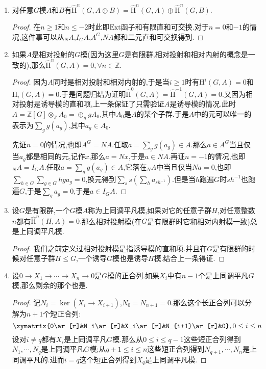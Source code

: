 \begin{enumerate}
\begin{proof}
		它们就可以拼凑成整个长正合列.
	\end{proof}
	\item 对任意$G$模$A$和$B$有$\widehat{\mathrm{H}}^n(G,A\oplus B)=\widehat{\mathrm{H}}^n(G,A)\oplus\widehat{\mathrm{H}}^n(G,B)$.
	\begin{proof}
		
		在$n\ge1$和$n\le-2$时此即$\mathrm{Ext}$函子和有限直和可交换.对于$n=0$和$-1$的情况,这件事可以从$_NA$,$I_GA$,$A^G$,$NA$都和二元直和可交换得到.
	\end{proof}
	\item 如果$A$是相对投射的$G$模(因为这里$G$是有限群,相对投射和相对内射的概念是一致的),那么$\widehat{\mathrm{H}}^n(G,A)=0,\forall n\in\mathbb{Z}$.
	\begin{proof}
		
		因为$A$同时是相对投射和相对内射的,于是当$i\ge1$时有$\mathrm{H}^i(G,A)=0$和$\mathrm{H}_i(G,A)=0$.于是问题归结为证明$\widehat{\mathrm{H}}^0(G,A)=\widehat{\mathrm{H}}^{-1}(G,A)=0$.又因为相对投射是诱导模的直和项,上一条保证了只需验证$A$是诱导模的情况.此时$A=\mathbb{Z}[G]\otimes_{\mathbb{Z}}A_0=\oplus_ggA_0$,其中$A_0$是$A$的某个子群.于是$A$中的元可以唯一的表示为$\sum_gg(a_g)$,其中$a_g\in A_0$.
		
		\qquad
		
		先证$n=0$的情况,也即$A^G=NA$.任取$a=\sum_gg(a_g)\in A$.那么$a\in A^G$当且仅当$a_g$都是相同的元,记作$x$,那么$a=Nx$,于是$a\in NA$.再证$n=-1$的情况,也即$_NA=I_GA$.任取$a=\sum_gg(a_g)\in A$,它落在$_NA$中当且仅当$Na=0$,也即$\sum_{h\in G}\sum_{g\in G}hga_g=0$,换元得到$\sum_ss(\sum_ha_{sh^{-1}})$.但是当$h$跑遍$G$时$sh^{-1}$也跑遍$G$,于是$\sum_ga_g=0$,于是$a\in I_GA$.
	\end{proof}
	\item 设$G$是有限群,一个$G$模$A$称为上同调平凡模,如果对它的任意子群$H$,对任意整数$n$都有$\widehat{\mathrm{H}}^n(H,A)=0$.那么相对投射模(在$G$是有限群时它和相对内射模一致)总是上同调平凡模.
	\begin{proof}
		
		我们之前定义过相对投射模是指诱导模的直和项.并且在$G$是有限群的时候对任意子群$H\le G$,一个诱导$G$模也是诱导$H$模.结合上一条得证.
	\end{proof}
	\item 设$0\to X_1\to\cdots\to X_n\to0$是$G$模的正合列.如果$X_i$中有$n-1$个是上同调平凡$G$模,那么剩余的那个也是.
	\begin{proof}
		
		记$N_i=\ker(X_i\to X_{i+1})$,$N_0=N_{n+1}=0$.那么这个长正合列可以分解为$n+1$个短正合列:
		$$\xymatrix{0\ar[r]&N_i\ar[r]&X_i\ar[r]&N_{i+1}\ar[r]&0},0\le i\le n$$
		设对$i\not=q$都有$X_i$是上同调平凡$G$模.那么从$0\le i\le q-1$这些短正合列得到$N_1,\cdots,N_q$是上同调平凡$G$模;从$q+1\le i\le n$这些短正合列得到$N_{q+1},\cdots,N_n$是上同调平凡的.进而$i=q$这个短正合列得到$X_q$是上同调平凡模.
	\end{proof}
\end{enumerate}

